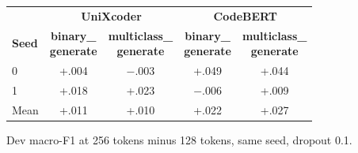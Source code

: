 \documentclass[11pt]{article}
\begin{document}
\medskip
{\centering
  \captionsetup{type=table}
  \small
  \setlength{\tabcolsep}{4pt}
  \begin{tabular}{lcccc}
    \hline
    & \multicolumn{2}{c}{\textbf{UniXcoder}} & \multicolumn{2}{c}{\textbf{CodeBERT}} \\
    \textbf{Seed} & \makecell{\textbf{binary\_}\\\textbf{generate}} & \makecell{\textbf{multiclass\_}\\\textbf{generate}} & \makecell{\textbf{binary\_}\\\textbf{generate}} & \makecell{\textbf{multiclass\_}\\\textbf{generate}} \\
    \hline
    0    & +.004 & $-$.003 & +.049   & +.044 \\
    1    & +.018 & +.023   & $-$.006 & +.009 \\
    \hline
    Mean & +.011 & +.010   & +.022   & +.027 \\
    \hline
  \end{tabular}
  \caption{Dev macro-F1 at 256 tokens minus 128 tokens, same seed, dropout 0.1.}
  \label{tab:length}
\par}
\end{document}
